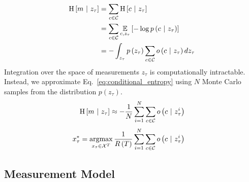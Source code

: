 \documentclass[conference]{IEEEtran}
\begin{document}
%
\begin{align}
  \begin{split}
    \text{H}
    \left[
      m
      \ \vert \
      z_{\tau}
    \right]
    &=
    \sum_{c \in \mc{C}}
    \text{H}
    \left[
      c
      \ \vert \
      z_{\tau}
    \right]
    \\
    &=
    \sum_{c \in \mc{C}}
    \expect_{c, z_{\tau}}
    \left[
      -\log
      p
      \left(
      c
      \ \vert \
      z_{\tau}
      \right)
    \right]
    \\
    &=
    -
    \int_{z_{\tau}}
    p
    \left(
    z_{\tau}
    \right)
    \sum_{c \in \mc{C}}
    o
    \left(
    c
    \ \vert \
    z_{\tau}
    \right)
    d z_{\tau}
    \label{eq:conditional_entropy}
  \end{split}
\end{align}
%
Integration over the space of measurements $z_{\tau}$ is computationally intractable. Instead, we approximate Eq.~\eqref{eq:conditional_entropy} using $N$ Monte Carlo samples from the distribution $p(z_{\tau})$.
%
\begin{align}
  \begin{split}
    \text{H}
    \left[
      m
      \ \vert \
      z_{\tau}
    \right]
    &\approx
    -\frac{1}{N}
    \sum_{i=1}^{N}
    \sum_{c \in \mathcal{C}}
    o
    \left(
    c
    \ \vert \
    z_{\tau}^{i}
    \right)
    \\
  \end{split}
\end{align}
%
\begin{align}
  \begin{split}
    x_{\tau}^{*}
    &=
    \argmax_{x_{\tau} \in \mc{X}^{T}}
    \frac{1}{R\left(T\right)}
    \sum_{i=1}^{N}
    \sum_{c \in \mc{C}}
    o
    \left(
    c \ \vert \ z_{\tau}^{i}
    \right)
  \end{split}
\end{align}
%
\subsection{Measurement Model}
\end{document}
